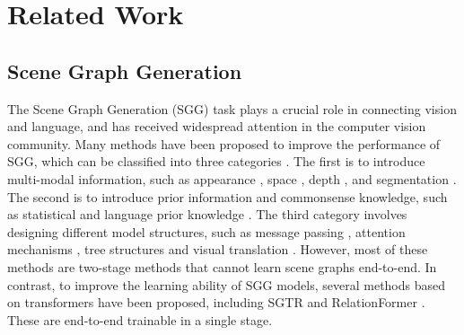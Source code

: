 \section{Related Work}

\subsection{Scene Graph Generation}
The Scene Graph Generation (SGG) \citep{lu2016visual} task plays a crucial role in connecting vision and language, and has received widespread attention in the computer vision community.
Many methods have been proposed to improve the performance of SGG, which can be classified into three categories \citep{zhu2022scene}.
The first is to introduce multi-modal information, such as appearance \citep{sadeghi2011recognition}, space \citep{zhu2017visual}, depth \citep{sharifzadeh2021improving}, and segmentation \citep{khandelwal2021segmentation}.
The second is to introduce prior information and commonsense knowledge, such as statistical \citep{baier2017improving, dai2017detecting, zellers2018neural, chen2019knowledge} and language prior knowledge \citep{lu2016visual, liao2019natural, zhang2019large, hwang2018tensorize, dupty2020visual}.
The third category involves designing different model structures, such as message passing \citep{li2017vip, dai2017detecting, li2017scene, zellers2018neural, gu2019scene, hu2022neural}, attention mechanisms \citep{zheng2019visual, qi2019attentive}, tree structures and visual translation \citep{zhang2017visual, hung2020contextual}. However, most of these methods are two-stage methods that cannot learn scene graphs end-to-end.
%
In contrast, to improve the learning ability of SGG models, several methods based on transformers have been proposed, including SGTR \citep{li2022sgtr} and RelationFormer \citep{shit2022relationformer}. These are end-to-end trainable in a single stage.

